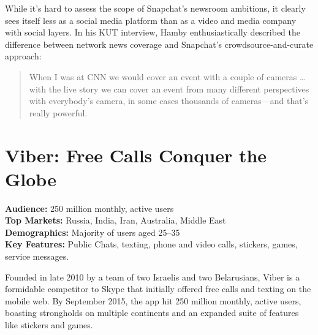 \documentclass[notoc, symmetric, nobib, nols]{towcenter-guideto-book}
\begin{document}



While it's hard to assess the scope of Snapchat's newsroom ambitions, it clearly sees itself less as a social media platform than as a video and media company with social layers. In his KUT interview, Hamby enthusiastically described the difference between network news coverage and Snapchat's crowdsource-and-curate approach:   

\begin{quote}
When I was at CNN we would cover an event with a couple of cameras \ldots with the live story we can cover an event from many different perspectives with everybody's camera, in some cases thousands of cameras---and that's really powerful.\autocite{KUTSnapchatElection}
\end{quote}

\section{Viber: Free Calls Conquer the Globe}

\begin{framed}
\noindent\textbf{Audience:} 250 million monthly, active users \\
\noindent\textbf{Top Markets:} Russia, India, Iran, Australia, Middle East\\
\noindent\textbf{Demographics:} Majority of users aged 25--35 \\
\noindent\textbf{Key Features:} Public Chats, texting, phone and video calls, stickers, games, service messages.
\end{framed}
\vspace{\baselineskip}
Founded in late 2010 by a team of two Israelis and two Belarusians, Viber is a formidable competitor to Skype that initially offered free calls and texting on the mobile web. By September 2015, the app hit 250 million monthly, active users, boasting strongholds on multiple continents and an expanded suite of features like stickers and games.  
\end{document}
